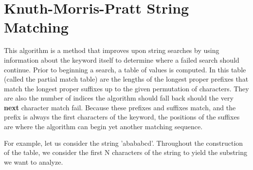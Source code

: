 \section{Knuth-Morris-Pratt String Matching}
This algorithm is a method that improves upon string searches by using information about the keyword itself to determine where a failed search should continue.
Prior to beginning a search, a table of values is computed.
In this table (called the partial match table) are the lengths of the longest proper prefixes that match the longest proper suffixes up to the given permutation of characters.
They are also the number of indices the algorithm should fall back should the very \textbf{next} character match fail.
Because these prefixes and suffixes match, and the prefix is always the first characters of the keyword, the positions of the suffixes are where the algorithm can begin yet another matching sequence.

For example, let us consider the string 'abababcd'.
Throughout the construction of the table, we consider the first N characters of the string to yield the substring we want to analyze.

